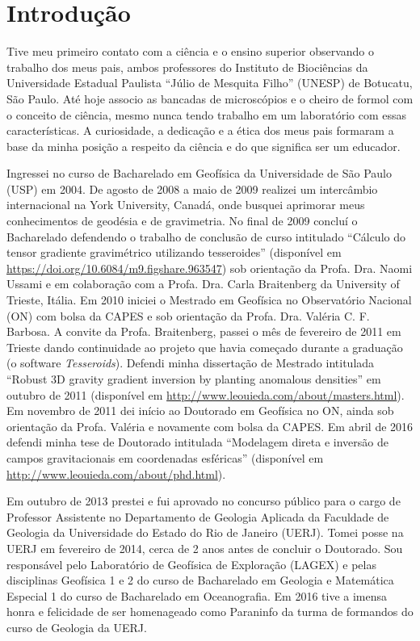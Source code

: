 \section{Introdução}


Tive meu primeiro contato com a ciência e o ensino superior observando o
trabalho dos meus pais, ambos professores do Instituto de Biociências da
Universidade Estadual Paulista ``Júlio de Mesquita Filho'' (UNESP) de Botucatu,
São Paulo.
Até hoje associo as bancadas de microscópios e o cheiro de formol com o
conceito de ciência, mesmo nunca tendo trabalho em um laboratório com essas
características.
A curiosidade, a dedicação e a ética dos meus pais formaram a base da minha
posição a respeito da ciência e do que significa ser um educador.

Ingressei no curso de Bacharelado em Geofísica da Universidade de São
Paulo (USP) em 2004.
De agosto de 2008 a maio de 2009 realizei um intercâmbio internacional na York
University, Canadá, onde busquei aprimorar meus conhecimentos de geodésia e de
gravimetria.
No final de 2009 concluí o Bacharelado defendendo o trabalho de conclusão de
curso intitulado
``Cálculo do tensor gradiente gravimétrico utilizando tesseroides''
(disponível em \url{https://doi.org/10.6084/m9.figshare.963547})
sob orientação da Profa. Dra. Naomi Ussami e em colaboração com a
Profa. Dra. Carla Braitenberg da University of Trieste, Itália.
Em 2010 iniciei o Mestrado em Geofísica no Observatório Nacional (ON) com bolsa
da CAPES e sob orientação da Profa. Dra. Valéria C. F. Barbosa.
A convite da Profa. Braitenberg, passei o mês de fevereiro de 2011 em Trieste
dando continuidade ao projeto que havia começado durante a graduação
(o software {\em Tesseroids}).
Defendi minha dissertação de Mestrado intitulada ``Robust 3D gravity gradient
inversion by planting anomalous densities'' em outubro de 2011 (disponível em
\url{http://www.leouieda.com/about/masters.html}).
Em novembro de 2011 dei início ao Doutorado em Geofísica no ON, ainda sob
orientação da Profa. Valéria e novamente com bolsa da CAPES.
Em abril de 2016 defendi minha tese de Doutorado intitulada ``Modelagem direta
e inversão de campos gravitacionais em coordenadas esféricas''
(disponível em \url{http://www.leouieda.com/about/phd.html}).

Em outubro de 2013 prestei e fui aprovado no concurso público para o cargo de
Professor Assistente no Departamento de Geologia Aplicada da Faculdade de
Geologia da Universidade do Estado do Rio de Janeiro (UERJ).
Tomei posse na UERJ em fevereiro de 2014, cerca de 2 anos antes de concluir o
Doutorado.
Sou responsável pelo Laboratório de Geofísica de Exploração (LAGEX) e pelas
disciplinas Geofísica 1 e 2 do curso de Bacharelado em Geologia e Matemática
Especial 1 do curso de Bacharelado em Oceanografia.
Em 2016 tive a imensa honra e felicidade de ser homenageado como Paraninfo da
turma de formandos do curso de Geologia da UERJ.

